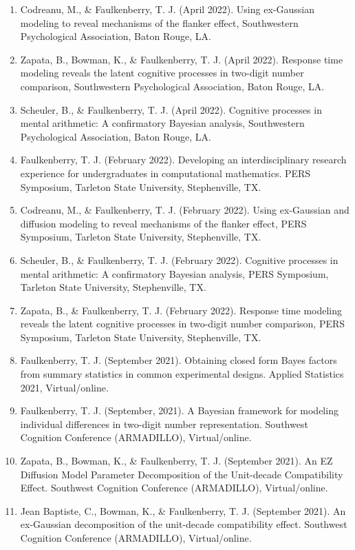 \documentclass[article,10pt]{article}
\begin{document}
\begin{enumerate}
\item Codreanu, M., \& Faulkenberry, T. J. (April 2022). Using ex-Gaussian modeling to reveal mechanisms of the flanker effect, Southwestern Psychological Association, Baton Rouge, LA.
\item Zapata, B., Bowman, K., \& Faulkenberry, T. J. (April 2022). Response time modeling reveals the latent cognitive processes in two-digit number comparison, Southwestern Psychological Association, Baton Rouge, LA.
\item Scheuler, B., \& Faulkenberry, T. J. (April 2022). Cognitive processes in mental arithmetic: A confirmatory Bayesian analysis, Southwestern Psychological Association, Baton Rouge, LA.
\item Faulkenberry, T. J. (February 2022). Developing an interdisciplinary research experience for undergraduates in computational mathematics. PERS Symposium, Tarleton State University, Stephenville, TX.
\item Codreanu, M., \& Faulkenberry, T. J. (February 2022). Using ex-Gaussian and diffusion modeling to reveal mechanisms of the flanker effect, PERS Symposium, Tarleton State University, Stephenville, TX.
\item Scheuler, B., \& Faulkenberry, T. J. (February 2022). Cognitive processes in mental arithmetic: A confirmatory Bayesian analysis, PERS Symposium, Tarleton State University, Stephenville, TX.
\item Zapata, B., \& Faulkenberry, T. J. (February 2022). Response time modeling reveals the latent cognitive processes in two-digit number comparison, PERS Symposium, Tarleton State University, Stephenville, TX.
\item Faulkenberry, T. J. (September 2021). Obtaining closed form Bayes factors from summary statistics in common experimental designs. Applied Statistics 2021, Virtual/online.
\item Faulkenberry, T. J. (September, 2021). A Bayesian framework for modeling individual differences in two-digit number representation. Southwest Cognition Conference (ARMADILLO), Virtual/online.
\item Zapata, B., Bowman, K., \& Faulkenberry, T. J. (September 2021). An EZ Diffusion Model Parameter Decomposition of the Unit-decade Compatibility Effect. Southwest Cognition Conference (ARMADILLO), Virtual/online.
\item Jean Baptiste, C., Bowman, K., \& Faulkenberry, T. J. (September 2021). An ex-Gaussian decomposition of the unit-decade compatibility effect. Southwest Cognition Conference (ARMADILLO), Virtual/online.

\end{enumerate}
\end{document}
